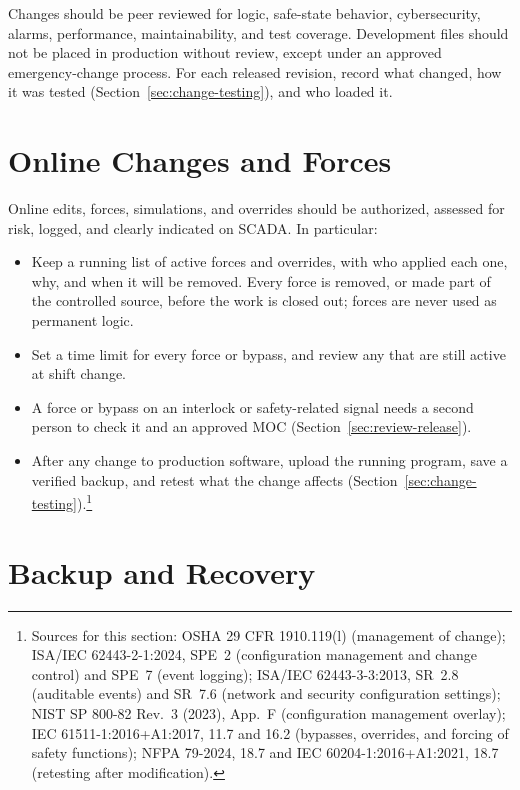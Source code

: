 Changes should be peer reviewed for logic, safe-state behavior, cybersecurity, alarms, performance, maintainability, and test coverage. Development files should not be placed in production without review, except under an approved emergency-change process. For each released revision, record what changed, how it was tested (Section~\ref{sec:change-testing}), and who loaded it.

\section{Online Changes and Forces}\label{sec:online-changes}

Online edits, forces, simulations, and overrides should be authorized, assessed for risk, logged, and clearly indicated on SCADA. In particular:
\begin{itemize}[itemsep=1pt]
  \item Keep a running list of active forces and overrides, with who applied each one, why, and when it will be removed. Every force is removed, or made part of the controlled source, before the work is closed out; forces are never used as permanent logic.
  \item Set a time limit for every force or bypass, and review any that are still active at shift change.
  \item A force or bypass on an interlock or safety-related signal needs a second person to check it and an approved MOC (Section~\ref{sec:review-release}).
  \item After any change to production software, upload the running program, save a verified backup, and retest what the change affects (Section~\ref{sec:change-testing}).\footnote{Sources for this section: OSHA 29 CFR 1910.119(l) (management of change); ISA/IEC 62443-2-1:2024, SPE~2 (configuration management and change control) and SPE~7 (event logging); ISA/IEC 62443-3-3:2013, SR~2.8 (auditable events) and SR~7.6 (network and security configuration settings); NIST SP 800-82 Rev.~3 (2023), App.~F (configuration management overlay); IEC 61511-1:2016+A1:2017, 11.7 and 16.2 (bypasses, overrides, and forcing of safety functions); NFPA 79-2024, 18.7 and IEC 60204-1:2016+A1:2021, 18.7 (retesting after modification).}
\end{itemize}

\section{Backup and Recovery}\label{sec:backup}

